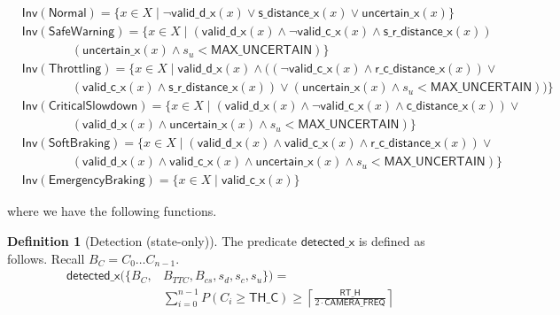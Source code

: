 \documentclass[12pt]{article}
\theoremstyle{definition}
\newtheorem{definition}{Definition}[section]
\begin{document}
\[
\begin{aligned}
&\mathsf{Inv}(\mathsf{Normal}) = \{ x \in X \mid \neg \mathsf{valid\_d\_x}(x) \lor \mathsf{s\_distance\_x}(x) \lor \mathsf{uncertain\_x}(x) \} \\
&\mathsf{Inv}(\mathsf{SafeWarning}) = \{ x \in X \mid (\mathsf{valid\_d\_x}(x) \land \neg \mathsf{valid\_c\_x}(x) \land \mathsf{s\_r\_distance\_x}(x))  \\ 
&\qquad\qquad(\mathsf{uncertain\_x}(x) \land s_u < \mathsf{MAX\_UNCERTAIN})\} \\
&\mathsf{Inv}(\mathsf{Throttling}) = \{ x \in X \mid \mathsf{valid\_d\_x}(x) \land \big( (\neg \mathsf{valid\_c\_x}(x) \land \mathsf{r\_c\_distance\_x}(x)) \lor \\ 
&\qquad\qquad(\mathsf{valid\_c\_x}(x) \land \mathsf{s\_r\_distance\_x}(x)) \lor (\mathsf{uncertain\_x}(x) \land s_u < \mathsf{MAX\_UNCERTAIN})\big) \} \\
&\mathsf{Inv}(\mathsf{CriticalSlowdown}) = \{ x \in X \mid (\mathsf{valid\_d\_x}(x) \land \neg \mathsf{valid\_c\_x}(x) \land \mathsf{c\_distance\_x}(x)) \lor \\
&\qquad\qquad(\mathsf{valid\_d\_x}(x) \land \mathsf{uncertain\_x}(x) \land s_u < \mathsf{MAX\_UNCERTAIN})\} \\
&\mathsf{Inv}(\mathsf{SoftBraking}) = \{ x \in X \mid (\mathsf{valid\_d\_x}(x) \land \mathsf{valid\_c\_x}(x) \land \mathsf{r\_c\_distance\_x}(x)) \lor \\ 
&\qquad\qquad (\mathsf{valid\_d\_x}(x) \land \mathsf{valid\_c\_x}(x) \land \mathsf{uncertain\_x}(x) \land s_u < \mathsf{MAX\_UNCERTAIN})\}\\
&\mathsf{Inv}(\mathsf{EmergencyBraking}) = \{ x \in X \mid \mathsf{valid\_c\_x}(x) \}
\end{aligned}
\]

where we have the following functions.

\begin{definition}[Detection (state-only)]
    The predicate $\mathsf{detected\_x}$ is defined as follows. Recall $B_C = C_0 \ldots C_{n-1}$.
    \[
        \begin{aligned}
            \mathsf{detected\_x}(\{B_C, &B_{TTC}, B_{cs}, s_d, s_c, s_u\}) = \\
            &\sum_{i=0}^{n-1} P(C_i \geq \mathsf{TH\_C}) \geq 
            \left\lceil \frac{\mathsf{RT\_H}}{ 2 \cdot \mathsf{CAMERA\_FREQ}} \right\rceil
        \end{aligned}
    \]
\end{definition}
\end{document}
